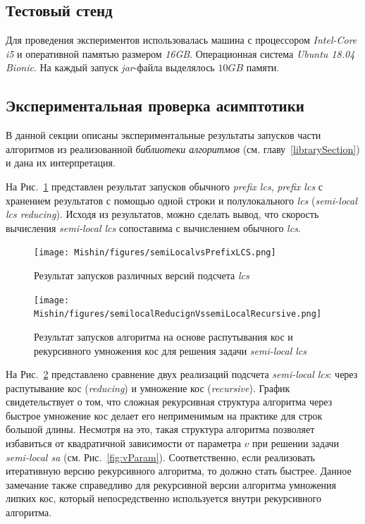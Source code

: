 \subsection{Тестовый стенд}

Для проведения экспериментов использовалась
машина с процессором \emph{Intel-Core i5} и оперативной памятью размером \emph{16GB}.
Операционная система \emph{Ubuntu 18.04 Bionic}.
На каждый запуск \emph{jar}-файла выделялось $10GB$ памяти.

\subsection{Экспериментальная проверка асимптотики}

В данной секции описаны экспериментальные результаты запусков части алгоритмов из реализованной \emph{библиотеки алгоритмов} (см. главу~\ref{librarySection})  и дана их интерпретация.

На Рис.~\ref{fig:speedlcs} представлен результат запусков
обычного \emph{prefix lcs}, \emph{prefix lcs} с хранением результатов с помощью одной строки и полулокального \emph{lcs} (\emph{semi-local lcs reducing}).
Исходя из результатов, можно сделать вывод, что скорость вычисления \emph{semi-local lcs} сопоставима с вычислением обычного \emph{lcs}.

\begin{figure}[t!]
\centering
    \texttt{[image: Mishin/figures/semiLocalvsPrefixLCS.png]}
    \caption{Результат запусков различных версий подсчета \emph{lcs} }\label{fig:speedlcs}
\end{figure}

\begin{figure}[t!]
\centering
    \texttt{[image: Mishin/figures/semilocalReducignVssemiLocalRecursive.png]}
    \caption{Результат запусков алгоритма на основе распутывания кос и рекурсивного умножения кос для решения задачи \emph{semi-local lcs} }\label{fig:speedlcs2}
\end{figure}

На Рис.~\ref{fig:speedlcs2} представлено сравнение двух реализаций подсчета \emph{semi-local lcs}: через распутывание кос (\emph{reducing}) и  умножение кос (\emph{recursive}).
График свидетельствует о том, что сложная  рекурсивная структура алгоритма через быстрое умножение кос делает его неприменимым на практике  для строк  большой длины. Несмотря на это, такая структура алгоритма позволяет избавиться от квадратичной зависимости от параметра $v$ при решении задачи \emph{semi-local sa} (см. Рис.~\ref{fig:vParam}).
Соответственно, если реализовать итеративную версию рекурсивного алгоритма, то должно стать быстрее.
Данное замечание также справедливо для рекурсивной версии алгоритма умножения липких кос, который непосредственно используется внутри рекурсивного алгоритма.

